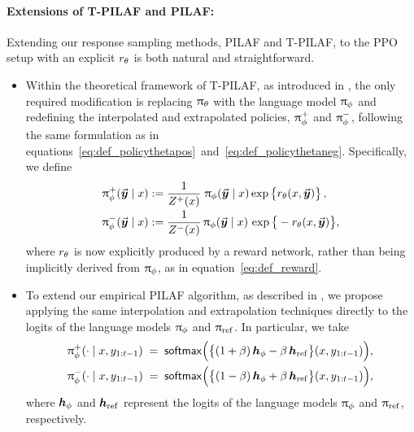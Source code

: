 \paragraph{Extensions of T-PILAF and PILAF:}
Extending our response sampling methods, PILAF and T-PILAF, to the PPO setup with an explicit $ r_{\theta} $ is both natural and straightforward.
\begin{itemize}
    \item Within the theoretical framework of T-PILAF, as introduced in , the only required modification is replacing $\uppi_{\theta}$ with the language model $\uppi_{\phi}$ and redefining the interpolated and extrapolated policies, $\uppi_{\phi}^+$ and $\uppi_{\phi}^-$, following the same formulation as in equations~\eqref{eq:def_policythetapos}~and~\eqref{eq:def_policythetaneg}.
    Specifically, we define
    \begin{subequations}
	\begin{align}
		\label{eq:def_policythetapos_PPO}
		\uppi_{\phi}^+(\vec{\boldsymbol{y}}\!\, \mid x)
		& := \frac{1}{Z^+(x)} \; \uppi_{\phi}(\vec{\boldsymbol{y}}\!\, \mid x)
		\exp \big\{ r_{\theta}(x, \vec{\boldsymbol{y}}\!\,) \big\} \, ,  \\[-1pt]
		\label{eq:def_policythetaneg_PPO}
		\uppi_{\phi}^-(\vec{\boldsymbol{y}}\!\, \mid x)
		& := \frac{1}{Z^-(x)} \, \uppi_{\phi}(\vec{\boldsymbol{y}}\!\, \mid x) \,
		\exp \big\{ - r_{\theta}(x, \vec{\boldsymbol{y}}\!\,) \big\},
	\end{align}
    \end{subequations}
    where $r_{\theta}$ is now explicitly produced by a reward network, rather than being implicitly derived from $\uppi_{\phi}$, as in equation~\eqref{eq:def_reward}.
    \item To extend our empirical PILAF algorithm, as described in , we propose applying the same interpolation and extrapolation techniques directly to the logits of the language models $\uppi_{\phi}$ and $\uppi_{{\rm ref}}$.
    In particular, we take
    \begin{align*}
        & \uppi_{\phi}^+(\cdot \mid x, y_{1:t-1}) \; = \; {\sf softmax}\Big( \big\{ (1 + \beta) \, \boldsymbol{h}_{\phi} - \beta \, \boldsymbol{h}_{{\rm ref}}\big\} (x, y_{1:t-1}) \Big), \\
        & \uppi_{\phi}^-(\cdot \mid x, y_{1:t-1}) \; = \; {\sf softmax}\Big( \big\{ (1 - \beta) \, \boldsymbol{h}_{\phi} + \beta \, \boldsymbol{h}_{{\rm ref}}\big\} (x, y_{1:t-1}) \Big),
    \end{align*}
    where $\boldsymbol{h}_{\phi}$ and $\boldsymbol{h}_{{\rm ref}}$ represent the logits of the language models $\uppi_{\phi}$ and $\uppi_{{\rm ref}}$, respectively.
\end{itemize}

